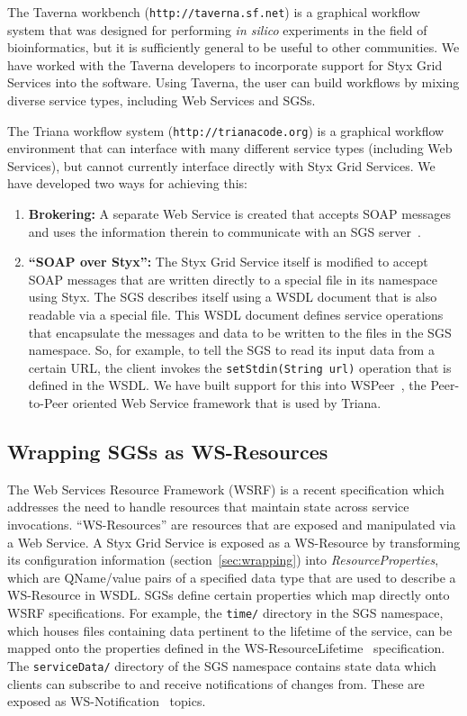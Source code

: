\documentclass[a4paper]{article}
\begin{document}
The Taverna workbench (\texttt{http://taverna.sf.net}) is a graphical workflow system that was designed for performing {\it in silico} experiments in the field of bioinformatics, but it is sufficiently general to be useful to other communities.  We have worked with the Taverna developers to incorporate support for Styx Grid Services into the software.  Using Taverna, the user can build workflows by mixing diverse service types, including Web Services and SGSs.

The Triana workflow system (\texttt{http://trianacode.org}) is a graphical workflow environment that can interface with many different service types (including Web Services), but cannot currently interface directly with Styx Grid Services.  We have developed two ways for achieving this:

\begin{enumerate}
	\item {\bf Brokering:} A separate Web Service is created that accepts SOAP messages and uses the information therein to communicate with an SGS server~\cite{blower:2005}.
	\item {\bf ``SOAP over Styx'':} The Styx Grid Service itself is modified to accept SOAP messages that are written directly to a special file in its namespace using Styx.  The SGS describes itself using a WSDL document that is also readable via a special file.  This WSDL document defines service operations that encapsulate the messages and data to be written to the files in the SGS namespace.  So, for example, to tell the SGS to read its input data from a certain URL, the client invokes the \texttt{setStdin(String url)} operation that is defined in the WSDL. We have built support for this into WSPeer~\cite{wspeer}, the Peer-to-Peer oriented Web Service framework that is used by Triana.
\end{enumerate}

\subsection{Wrapping SGSs as WS-Resources}\label{subsec:ws-resources}

The Web Services Resource Framework (WSRF) is a recent specification which addresses the need to handle resources that maintain state across service invocations. ``WS-Resources'' are resources that are exposed and manipulated via a Web Service. A Styx Grid Service is exposed as a WS-Resource by transforming its configuration information (section~\ref{sec:wrapping}) into \textit{ResourceProperties\/}, which are QName/value pairs of a specified data type that are used to describe a WS-Resource in WSDL. SGSs define certain properties which map directly onto WSRF specifications. For example, the \texttt{time/} directory in the SGS namespace, which houses files containing data pertinent to the lifetime of the service, can be mapped onto the properties defined in the WS-ResourceLifetime~\cite{wsrf-lifetime} specification.  The \texttt{serviceData/} directory of the SGS namespace contains state data which clients can subscribe to and receive notifications of changes from. These are exposed as WS-Notification~\cite{wsrf-notification} topics.
\end{document}
